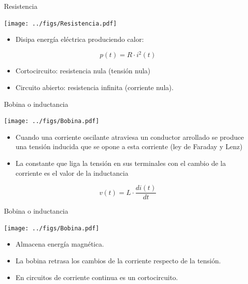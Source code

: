 \documentclass[xcolor={usenames,svgnames,dvipsnames}]{beamer}
\begin{document}
\begin{frame}[label={sec:orgf843064}]{Resistencia}
\begin{center}
\texttt{[image: ../figs/Resistencia.pdf]}
\end{center}


\begin{itemize}
\item Disipa energía eléctrica produciendo \alert{calor}:
\end{itemize}
\[
p(t)=R\cdot i^{2}(t)
\]

\begin{itemize}
\item Cortocircuito: resistencia nula (tensión nula)

\item Circuito abierto: resistencia infinita (corriente nula).
\end{itemize}
\end{frame}


\begin{frame}[label={sec:orge20f17d}]{Bobina o inductancia}
\begin{center}
\texttt{[image: ../figs/Bobina.pdf]}
\end{center}


\begin{itemize}
\item Cuando una corriente oscilante atraviesa un conductor arrollado se
produce una \alert{tensión inducida que se opone a esta corriente} (ley de
Faraday y Lenz)

\item La constante que liga la tensión en sus terminales con el cambio de
la corriente es el valor de la inductancia
\end{itemize}

\[
v(t)=L\cdot\frac{di(t)}{dt}
\]
\end{frame}

\begin{frame}[label={sec:orgcb10df4}]{Bobina o inductancia}
\begin{center}
\texttt{[image: ../figs/Bobina.pdf]}
\end{center}


\begin{itemize}
\item Almacena \alert{energía magnética}.

\item La bobina \alert{retrasa los cambios de la corriente} respecto de la
tensión.

\item En circuitos de corriente continua es un cortocircuito.
\end{itemize}
\end{frame}
\end{document}
